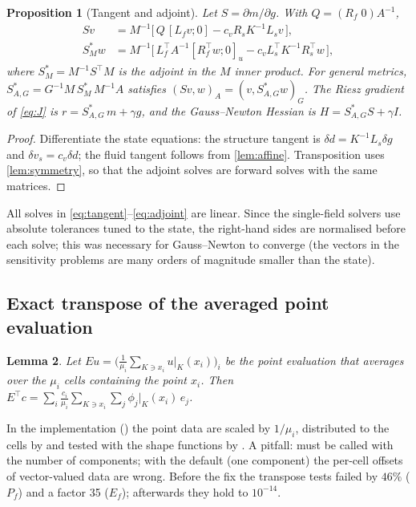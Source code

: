 \documentclass[11pt,a4paper]{article}
\newtheorem{proposition}{Proposition}[section]
\newtheorem{lemma}[proposition]{Lemma}
\theoremstyle{definition}
\theoremstyle{remark}
\newcommand{\M}{M}
\begin{document}
\begin{proposition}[Tangent and adjoint]\label{prop:derivatives}
Let $S = \partial m/\partial g$. With $Q=(R_f\;0)A^{-1}$,
\begin{align}
  S v &= \M^{-1}\big[\,Q\,[L_f v;0] - c_v R_s K^{-1}L_s v\,\big], \label{eq:tangent}\\
  S^{*}_{\M} w &= \M^{-1}\big[\,L_f^{\top} A^{-1}[R_f^{\top}w;0]_u - c_v L_s^{\top} K^{-1} R_s^{\top} w\,\big],
  \label{eq:adjoint}
\end{align}
where $S^*_{\M} = \M^{-1}S^{\top}\M$ is the adjoint in the $\M$ inner product. For general metrics,
$S^*_{A,G} = G^{-1}\M\, S^*_{\M}\, \M^{-1}A$ satisfies $(Sv,w)_A = (v,S^*_{A,G}w)_G$. The Riesz
gradient of \eqref{eq:J} is $r = S^*_{A,G}\,m + \gamma g$, and the Gauss--Newton Hessian is
$H = S^*_{A,G}S + \gamma I$.
\end{proposition}
\begin{proof}
Differentiate the state equations: the structure tangent is $\delta d = K^{-1}L_s\delta g$ and
$\delta v_s = c_v\delta d$; the fluid tangent follows from \cref{lem:affine}. Transposition uses
\cref{lem:symmetry}, so that the adjoint solves are forward solves with the same matrices.
\end{proof}

All solves in \eqref{eq:tangent}--\eqref{eq:adjoint} are linear. Since the single-field solvers use
absolute tolerances tuned to the state, the right-hand sides are normalised before each solve; this
was necessary for Gauss--Newton to converge (the vectors in the sensitivity problems are many orders
of magnitude smaller than the state).

\subsection{Exact transpose of the averaged point evaluation}

\begin{lemma}\label{lem:transpose}
Let $E u = \big(\frac{1}{\mu_i}\sum_{K\ni x_i} u|_K(x_i)\big)_i$ be the point evaluation that
averages over the $\mu_i$ cells containing the point $x_i$. Then
$E^{\top}c = \sum_i \frac{c_i}{\mu_i}\sum_{K\ni x_i}\sum_{j}\phi_j|_K(x_i)\, e_j$.
\end{lemma}
In the implementation () the point data are scaled by
$1/\mu_i$, distributed to the cells by  and
tested with the shape functions by . A pitfall:
 must be called with the number of components; with the default
(one component) the per-cell offsets of vector-valued data are wrong. Before the fix the transpose
tests failed by $46\%$ ($P_f$) and a factor 35 ($E_f$); afterwards they hold to $10^{-14}$.
\end{document}
